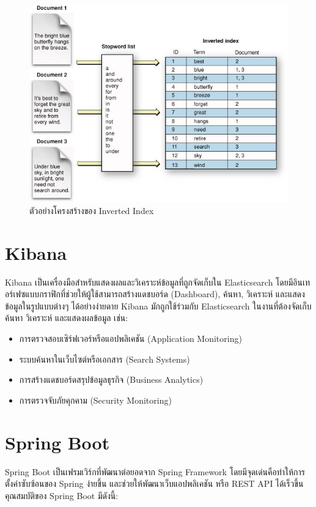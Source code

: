 \begin{figure}[H]
\centering
\includegraphics[width=\linewidth, keepaspectratio]{pictures/inverted_index.jpg}
\caption[Inverted Index]{ตัวอย่างโครงสร้างของ Inverted Index}
\label{fig:inverted_index}
\end{figure}


\section{Kibana}
\hspace{1.27cm}Kibana เป็นเครื่องมือสำหรับแสดงผลและวิเคราะห์ข้อมูลที่ถูกจัดเก็บใน Elasticsearch โดยมีอินเทอร์เฟซแบบกราฟิกที่ช่วยให้ผู้ใช้สามารถสร้างแดชบอร์ด (Dashboard), ค้นหา, วิเคราะห์ และแสดงข้อมูลในรูปแบบต่างๆ ได้อย่างง่ายดาย
Kibana มักถูกใช้ร่วมกับ Elasticsearch ในงานที่ต้องจัดเก็บ ค้นหา วิเคราะห์ และแสดงผลข้อมูล เช่น:
\begin{itemize}
\item การตรวจสอบเซิร์ฟเวอร์หรือแอปพลิเคชัน (Application Monitoring)
\item ระบบค้นหาในเว็บไซต์หรือเอกสาร (Search Systems)
\item การสร้างแดชบอร์ดสรุปข้อมูลธุรกิจ (Business Analytics)
\item การตรวจจับภัยคุกคาม (Security Monitoring)
\end{itemize}

\section{Spring Boot}
\hspace{1.27cm}Spring Boot เป็นเฟรมเวิร์กที่พัฒนาต่อยอดจาก Spring Framework โดยมีจุดเด่นคือทำให้การตั้งค่าซับซ้อนของ Spring ง่ายขึ้น และช่วยให้พัฒนาเว็บแอปพลิเคชัน หรือ REST API ได้เร็วขึ้น คุณสมบัติของ Spring Boot มีดังนี้:

